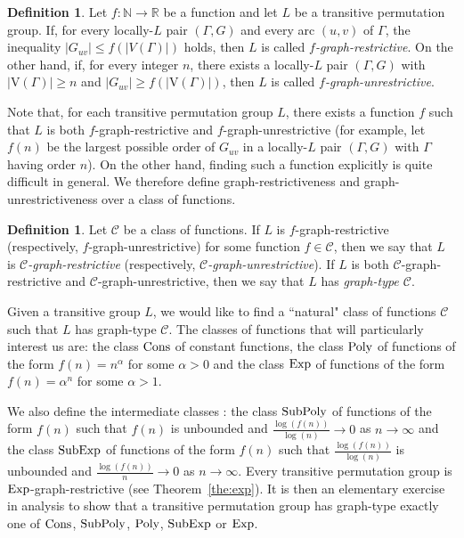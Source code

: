 \documentclass{amsart}
\theoremstyle{definition}
\newtheorem{definition}[theorem]{Definition}
\begin{document}
\begin{definition}
\label{def:f-restrictive} 
Let $f\colon  {\mathbb N} \to {\mathbb R}$ be a function and let $L$ be a transitive permutation group. If, for every locally-$L$ pair $(\Gamma,G)$  and every arc $(u,v)$ of $\Gamma$, the inequality $|G_{uv}|\leq f(|V(\Gamma)|)$ holds, then $L$ is called \emph{$f$-graph-restrictive}. On the other hand, if, for every integer $n$, there exists a locally-$L$ pair  $(\Gamma,G)$ with $|{\mathrm V}(\Gamma)| \ge n$ and $|G_{uv}| \ge f(|{\mathrm V}(\Gamma)|)$, then $L$ is called \emph{$f$-graph-unrestrictive}.
\end{definition}

Note that, for each transitive permutation group $L$, there exists a function $f$ such that $L$ is both $f$-graph-restrictive and $f$-graph-unrestrictive (for example, let $f(n)$ be the largest possible order of $G_{uv}$ in a locally-$L$ pair $(\Gamma,G)$ with $\Gamma$ having order $n$).  On the other hand, finding such a function explicitly is quite difficult in general. We therefore define graph-restrictiveness and graph-unrestrictiveness over a class of functions.

\begin{definition}
Let ${\mathcal C}$ be a class of functions. If $L$ is $f$-graph-restrictive (respectively, $f$-graph-unrestrictive) for some function $f \in {\mathcal C}$, then we say that $L$ is {\em ${\mathcal C}$-graph-restrictive} (respectively, {\em ${\mathcal C}$-graph-unrestrictive}). If $L$ is both ${\mathcal C}$-graph-restrictive and ${\mathcal C}$-graph-unrestrictive, then we say that $L$ has \emph{graph-type ${\mathcal C}$}.
\end{definition} 

Given a transitive group $L$, we would like to find a ``natural" class of functions ${\mathcal C}$ such that $L$ has graph-type ${\mathcal C}$. The classes of functions that will particularly interest us are: the class ${\mathop{\rm Cons}}$ of constant functions, the class ${\mathop{\rm Poly}}$ of functions of the form $f(n) = n^\alpha$ for some $\alpha > 0$ and the class ${\mathop{\rm Exp}}$ of functions of the form $f(n)=\alpha^n$ for some $\alpha>1$. 

We also define the intermediate classes : the class ${\mathop{\rm SubPoly}}$ of functions of the form $f(n)$ such that $f(n)$ is unbounded and $\frac{\log(f(n))}{\log(n)}\to 0$ as $n\to \infty$ and the class ${\mathop{\rm SubExp}}$ of functions of the form $f(n)$ such that $\frac{\log(f(n))}{\log(n)}$ is unbounded and $\frac{\log(f(n))}{n}\to 0$ as $n\to \infty$. 
Every transitive permutation group is ${\mathop{\rm Exp}}$-graph-restrictive (see Theorem~\ref{the:exp}). It is then an elementary exercise in analysis to show that a transitive permutation group has graph-type exactly one of ${\mathop{\rm Cons}}$, ${\mathop{\rm SubPoly}}$, ${\mathop{\rm Poly}}$, ${\mathop{\rm SubExp}}$ or ${\mathop{\rm Exp}}$.
\end{document}
